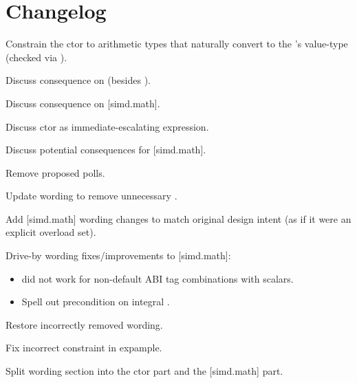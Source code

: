 \section{Changelog}
\begin{revision}
\item Constrain the  ctor to arithmetic types that naturally
  convert to the 's value-type (checked via ).
\item Discuss consequence on  (besides ).
\item Discuss consequence on [simd.math].
\item Discuss  ctor as immediate-escalating expression.
\item Discuss potential consequences for [simd.math].
\end{revision}

\begin{revision}
\item Remove proposed polls.
\item Update wording to remove unnecessary .
\item Add [simd.math] wording changes to match original design intent (as if it
  were an explicit overload set).
\item Drive-by wording fixes/improvements to [simd.math]:
  \begin{itemize}
    \item {} did not work for non-default ABI
      tag combinations with scalars.
    \item Spell out precondition on integral .
  \end{itemize}
\end{revision}

\begin{revision}
\item Restore incorrectly removed  wording.
\item Fix incorrect constraint in  expample.
\item Split wording section into the  ctor part and the [simd.math] part.
\end{revision}

